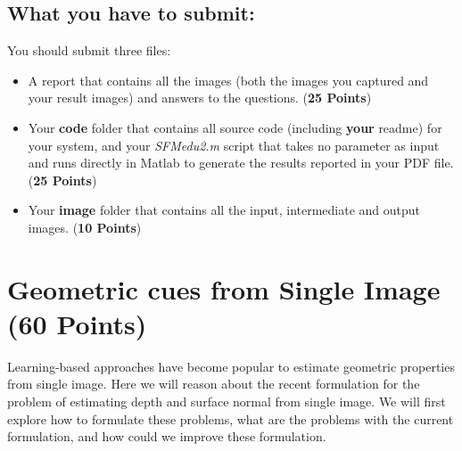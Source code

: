 \documentclass[11pt]{article}
\begin{document}
\subsection{What you have to submit:}
\label{sec:tosubmit}
You should submit three files:
\begin{itemize}
\item A report that contains all the images (both the images you captured and your result images) and answers to the questions. (\textbf{25 Points})
\item Your \textbf{code} folder that contains all source code (including \textbf{your} readme) for your system, and your \textit{SFMedu2.m} script that takes no parameter as input and runs directly in Matlab to generate the results reported in your PDF file. (\textbf{25 Points})
\item Your \textbf{image} folder that contains all the input, intermediate and output images. (\textbf{10 Points})
\end{itemize}


\section{Geometric cues from Single Image (60 Points)}

Learning-based approaches have become popular to estimate geometric properties from single image. Here we will reason about the recent formulation for the problem of estimating depth and surface normal from single image. We will first explore how to formulate these problems, what are the problems with the current formulation, and how could we improve these formulation. 
\end{document}
